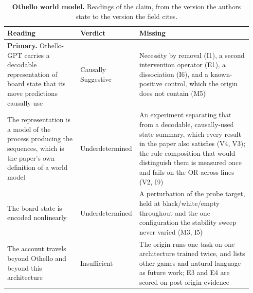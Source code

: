 \clearpage
\begin{table}[H]
\centering
\footnotesize
\caption{\textbf{Othello world model.} Readings of the claim, from the version the authors state to the version the
field cites.}
\label{tab:othello-readings}
\renewcommand{\arraystretch}{1.18}
\begin{tabular}{@{}>{\raggedright\arraybackslash}p{3.3cm}l>{\raggedright\arraybackslash}p{4.4cm}@{}}
\toprule
\textbf{Reading} & \textbf{Verdict} & \textbf{Missing} \\
\midrule
\textbf{Primary.} Othello-GPT carries a decodable representation of board state that its move predictions causally use
  & Causally Suggestive
  & Necessity by removal (I1), a second intervention operator (E1), a dissociation (I6), and a known-positive control, which the origin does not contain (M5) \\
\addlinespace[2pt]
The representation is a model of the process producing the sequences, which is the paper's own definition of a world model
  & Underdetermined
  & An experiment separating that from a decodable, causally-used state summary, which every result in the paper also satisfies (V4, V3); the rule composition that would distinguish them is measured once and fails on the OR across lines (V2, I9) \\
\addlinespace[2pt]
The board state is encoded nonlinearly
  & Underdetermined
  & A perturbation of the probe target, held at black/white/empty throughout and the one configuration the stability sweep never varied (M3, I5) \\
\addlinespace[2pt]
The account travels beyond Othello and beyond this architecture
  & Insufficient
  & The origin runs one task on one architecture trained twice, and lists other games and natural language as future work; E3 and E4 are scored on post-origin evidence \\
\bottomrule
\end{tabular}
\end{table}

